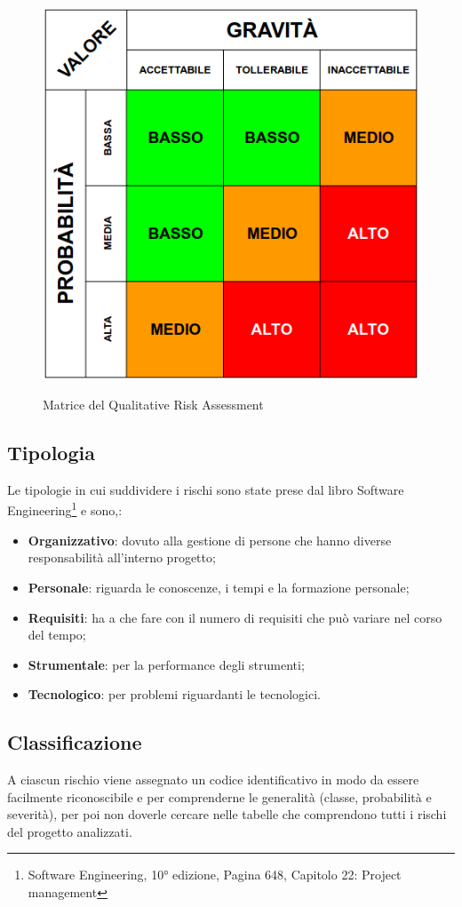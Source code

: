 	\begin{figure}[H]
		\centering
		\includegraphics[scale=0.5]{img/risk_assessment_table.png}\\
		\caption{Matrice del Qualitative Risk Assessment}
	\end{figure}
	\subsection{Tipologia}
	Le tipologie in cui suddividere i rischi sono state prese dal libro Software Engineering\footnote{Software Engineering, 10° edizione, Pagina 648, Capitolo 22: Project management} e sono,:
	\begin{itemize}
 		\item \textbf{Organizzativo}: dovuto alla gestione di persone che hanno diverse responsabilità all'interno progetto;
		\item \textbf{Personale}: riguarda le conoscenze, i tempi e la formazione personale;
		\item \textbf{Requisiti}: ha a che fare con il numero di requisiti che può variare nel corso del tempo;
		\item \textbf{Strumentale}: per la performance degli strumenti;
		\item \textbf{Tecnologico}: per problemi riguardanti le tecnologici.
	\end{itemize}
	\subsection{Classificazione}
	A ciascun rischio viene assegnato un codice identificativo in modo da essere facilmente riconoscibile e per comprenderne le generalità (classe, probabilità e severità), per poi non doverle cercare nelle tabelle che comprendono tutti i rischi del progetto analizzati.
	
